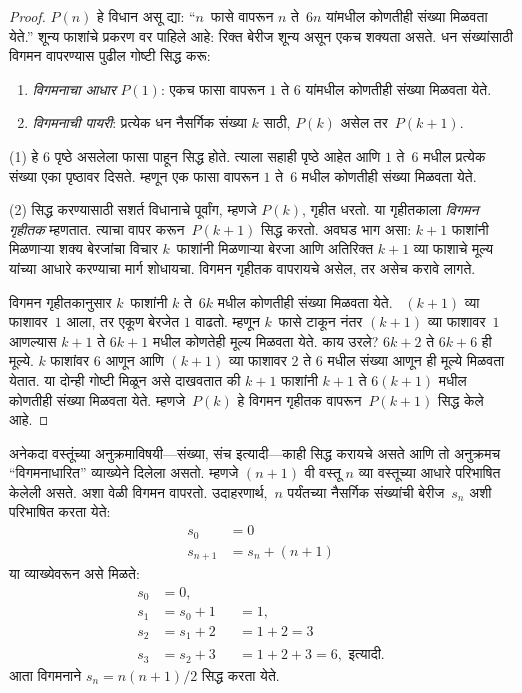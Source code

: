 \documentclass[../../../include/open-logic-section]{subfiles}
\begin{document}
\begin{proof}
$P(n)$ हे विधान असू द्या: “$n$~फासे वापरून $n$ ते~$6n$ यांमधील कोणतीही संख्या मिळवता येते.” शून्य फाशांचे प्रकरण वर पाहिले आहे: रिक्त बेरीज शून्य असून एकच शक्यता असते. धन संख्यांसाठी विगमन वापरण्यास पुढील गोष्टी सिद्ध करू:
\begin{enumerate}
\item \emph{विगमनाचा आधार} $P(1)$: एकच फासा वापरून $1$ ते $6$ यांमधील कोणतीही संख्या मिळवता येते.
\item \emph{विगमनाची पायरी}: प्रत्येक धन नैसर्गिक संख्या $k$ साठी, $P(k)$ असेल तर~$P(k+1)$.
\end{enumerate}

(1) हे $6$ पृष्ठे असलेला फासा पाहून सिद्ध होते. त्याला सहाही पृष्ठे आहेत आणि $1$ ते~$6$ मधील प्रत्येक संख्या एका पृष्ठावर दिसते. म्हणून एक फासा वापरून $1$ ते~$6$ मधील कोणतीही संख्या मिळवता येते.

(2) सिद्ध करण्यासाठी सशर्त विधानाचे पूर्वांग, म्हणजे $P(k)$, गृहीत धरतो. या गृहीतकाला \emph{विगमन गृहीतक} म्हणतात. त्याचा वापर करून~$P(k+1)$ सिद्ध करतो. अवघड भाग असा: $k+1$ फाशांनी मिळणाऱ्या शक्य बेरजांचा विचार $k$~फाशांनी मिळणाऱ्या बेरजा आणि अतिरिक्त $k+1$ व्या फाशाचे मूल्य यांच्या आधारे करण्याचा मार्ग शोधायचा. विगमन गृहीतक वापरायचे असेल, तर असेच करावे लागते.

विगमन गृहीतकानुसार $k$~फाशांनी $k$ ते~$6k$ मधील कोणतीही संख्या मिळवता येते. ~$(k+1)$ व्या फाशावर~$1$ आला, तर एकूण बेरजेत $1$ वाढतो. म्हणून $k$~फासे टाकून नंतर $(k+1)$ व्या फाशावर~$1$ आणल्यास $k+1$ ते $6k+1$ मधील कोणतेही मूल्य मिळवता येते. काय उरले? $6k+2$ ते $6k+6$ ही मूल्ये. $k$ फाशांवर $6$ आणून आणि $(k+1)$ व्या फाशावर $2$ ते $6$ मधील संख्या आणून ही मूल्ये मिळवता येतात. या दोन्ही गोष्टी मिळून असे दाखवतात की $k+1$ फाशांनी $k+1$ ते $6(k+1)$ मधील कोणतीही संख्या मिळवता येते. म्हणजे~$P(k)$ हे विगमन गृहीतक वापरून~$P(k+1)$ सिद्ध केले आहे.
\end{proof}

अनेकदा वस्तूंच्या अनुक्रमाविषयी---संख्या, संच इत्यादी---काही सिद्ध करायचे असते आणि तो अनुक्रमच “विगमनाधारित” व्याख्येने दिलेला असतो. म्हणजे $(n+1)$ वी वस्तू $n$ व्या वस्तूच्या आधारे परिभाषित केलेली असते. अशा वेळी विगमन वापरतो. उदाहरणार्थ,~$n$ पर्यंतच्या नैसर्गिक संख्यांची बेरीज~$s_n$ अशी परिभाषित करता येते:
\begin{align*}
  s_0 & = 0\\
  s_{n+1} & = s_n + (n+1)
\end{align*}
या व्याख्येवरून असे मिळते:
\begin{align*}
  s_0 & = 0,\\
  s_1 & = s_0 + 1 && = 1,\\
  s_2 & = s_1 + 2 && = 1 + 2 = 3\\
  s_3 & = s_2 + 3 && = 1 + 2 + 3 = 6, \text{ इत्यादी.}
\end{align*}
आता विगमनाने $s_n = n(n+1)/2$ सिद्ध करता येते.
\end{document}
